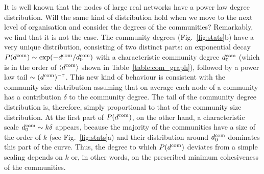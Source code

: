 \documentclass[11pt,a4paper]{article}
\begin{document}
It is well known
\cite{barabasi-albert,albert-revmod,dm-book}
that the nodes of large real networks have a power law degree
distribution. Will the same kind of distribution hold when we move
to the next level of organisation and consider the degrees of the
communities?
Remarkably, we find that it is not the case.
The community degrees (Fig.~\ref{fig:stats}b) have a
very unique distribution, consisting of two distinct parts: an
exponential decay $P(d^{\rm com})\sim\exp(-d^{\rm com}/d^{\rm com}_0)$ with a
characteristic community degree $d^{\rm com}_0$
(which is in the order of $\left<d^{\rm com}\right>$ shown in
Table~\ref{table:com_graph}), followed by a power law
tail $\sim(d^{\rm com})^{-\tau}$. This new kind of behaviour is consistent
with the community size distribution assuming that on average each
node of a community has a contribution $\delta$ to the community
%
degree. The tail of the community degree distribution is, therefore,
simply proportional to that of the community size distribution. At the
first part of $P(d^{\rm com})$, on the other hand,
a characteristic scale $d^{\rm com}_0\sim k\delta$ appears, because the
majority of the communities have a size of the order of $k$ (see
Fig.~\ref{fig:stats}a) and their distribution around $d^{\rm com}_0$
dominates this part of the curve.
%
%
Thus, the
degree to which $P(d^{\rm com})$ deviates from a simple scaling depends on
$k$ or, in other words, on the prescribed minimum cohesiveness of the
communities.


\end{document}
